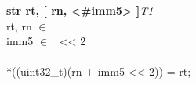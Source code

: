 


\begin{instructionblock}{\imagewidth}%
    \textbf{str rt, [ rn, <\#imm5> ]}\hfill\textit{T1}\\
    rt, rn $\in$ \baseregisters\\
    imm5 $\in$ \immFive\ {<}{<} 2\\
    \\
    {*}((uint32\_t)(rn + imm5 {<}{<} 2)) = rt;
\end{instructionblock}

